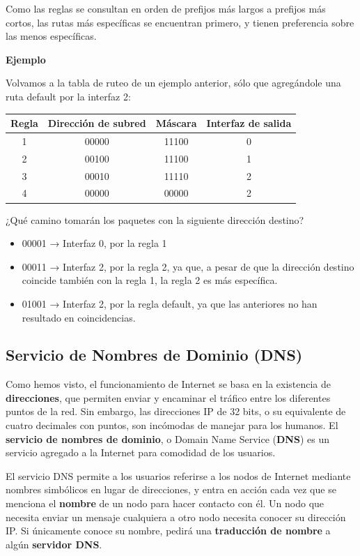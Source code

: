 \documentclass[spanish,a4paper,]{article}
\providecommand{\tightlist}{%
  \setlength{\itemsep}{0pt}\setlength{\parskip}{0pt}}
\begin{document}
Como las reglas se consultan en orden de prefijos más largos a prefijos
más cortos, las rutas más específicas se encuentran primero, y tienen
preferencia sobre las menos específicas.

\textbf{Ejemplo}

Volvamos a la tabla de ruteo de un ejemplo anterior, sólo que
agregándole una ruta default por la interfaz 2:

\begin{longtable}[]{@{}cccc@{}}
\toprule
Regla & Dirección de subred & Máscara & Interfaz de
salida\tabularnewline
\midrule
\endhead
1 & 00000 & 11100 & 0\tabularnewline
2 & 00100 & 11100 & 1\tabularnewline
3 & 00010 & 11110 & 2\tabularnewline
4 & 00000 & 00000 & 2\tabularnewline
\bottomrule
\end{longtable}

¿Qué camino tomarán los paquetes con la siguiente dirección destino?

\begin{itemize}
\tightlist
\item
  00001 → Interfaz 0, por la regla 1
\item
  00011 → Interfaz 2, por la regla 2, ya que, a pesar de que la
  dirección destino coincide también con la regla 1, la regla 2 es más
  específica.
\item
  01001 → Interfaz 2, por la regla default, ya que las anteriores no han
  resultado en coincidencias.
\end{itemize}

\hypertarget{servicio-de-nombres-de-dominio-dns}{%
\subsection{Servicio de Nombres de Dominio
(DNS)}\label{servicio-de-nombres-de-dominio-dns}}

Como hemos visto, el funcionamiento de Internet se basa en la existencia
de \textbf{direcciones}, que permiten enviar y encaminar el tráfico
entre los diferentes puntos de la red. Sin embargo, las direcciones IP
de 32 bits, o su equivalente de cuatro decimales con puntos, son
incómodas de manejar para los humanos. El \textbf{servicio de nombres de
dominio}, o Domain Name Service (\textbf{DNS}) es un servicio agregado a
la Internet para comodidad de los usuarios.

El servicio DNS permite a los usuarios referirse a los nodos de Internet
mediante nombres simbólicos en lugar de direcciones, y entra en acción
cada vez que se menciona el \textbf{nombre} de un nodo para hacer
contacto con él. Un nodo que necesita enviar un mensaje cualquiera a
otro nodo necesita conocer su dirección IP. Si únicamente conoce su
nombre, pedirá una \textbf{traducción de nombre} a algún
\textbf{servidor DNS}.
\end{document}
